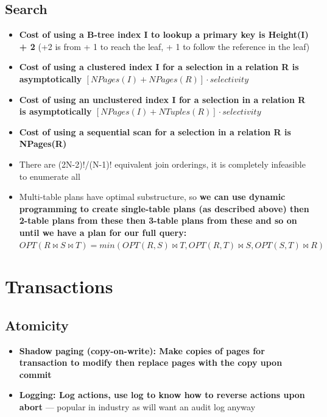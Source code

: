 \documentclass[20pt,a4paper,landscape]{extarticle}
\begin{document}
\begin{flushleft}
\subsection{Search}
\begin{itemize}
\item \textbf{Cost of using a B-tree index I to lookup a primary key is Height(I) + 2} (+2 is from + 1 to reach the leaf, + 1 to follow the reference in the leaf)
\item \textbf{Cost of using a clustered index I for a selection in a relation R is asymptotically \boldmath$[NPages(I) + NPages(R)] \cdot selectivity$}
\item \textbf{Cost of using an unclustered index I for a selection in a relation R is asymptotically \boldmath$[NPages(I) + NTuples(R)] \cdot selectivity$}
\item \textbf{Cost of using a sequential scan for a selection in a relation R is NPages(R)}
\item There are (2N-2)!/(N-1)! equivalent join orderings, it is completely infeasible to enumerate all
\item Multi-table plans have optimal substructure, so \textbf{we can use dynamic programming to create single-table plans (as described above) then 2-table plans from these then 3-table plans from these and so on until we have a plan for our full query: \boldmath$OPT(R \bowtie S \bowtie T) = min(OPT(R, S) \bowtie T, OPT(R, T) \bowtie S, OPT(S, T) \bowtie R)$}
\end{itemize}
\clearpage
\section{Transactions}
\subsection{Atomicity}
\begin{itemize}
\item \textbf{Shadow paging (copy-on-write): Make copies of pages for transaction to modify then replace pages with the copy upon commit}
\item \textbf{Logging: Log actions, use log to know how to reverse actions upon abort} --- popular in industry as will want an audit log anyway
\end{itemize}

\end{flushleft}
\end{document}
